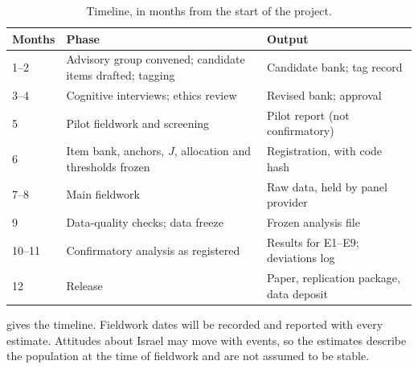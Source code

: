 \begin{table}[tbp]
\centering
\caption{Timeline, in months from the start of the project.}\label{tab:design-timeline}
\small
\begin{tabular}{@{}lll@{}}
\toprule
Months & Phase & Output \\
\midrule
1--2 & Advisory group convened; candidate items drafted; tagging & Candidate bank; tag record \\
3--4 & Cognitive interviews; ethics review & Revised bank; approval \\
5 & Pilot fieldwork and screening & Pilot report (not confirmatory) \\
6 & Item bank, anchors, $J$, allocation and thresholds frozen & Registration, with code hash \\
7--8 & Main fieldwork & Raw data, held by panel provider \\
9 & Data-quality checks; data freeze & Frozen analysis file \\
10--11 & Confirmatory analysis as registered & Results for E1--E9; deviations log \\
12 & Release & Paper, replication package, data deposit \\
\bottomrule
\end{tabular}
\end{table}

 gives the timeline. Fieldwork dates will be recorded and reported with every estimate. Attitudes about Israel may move with events, so the estimates describe the population at the time of fieldwork and are not assumed to be stable.

